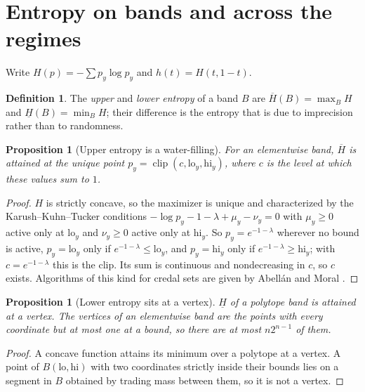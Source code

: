 \documentclass[11pt]{article}
\newtheorem{proposition}[theorem]{Proposition}
\theoremstyle{definition}
\newtheorem{definition}[theorem]{Definition}
\theoremstyle{remark}
\newcommand{\Hup}{\overline{H}}
\newcommand{\Hlo}{\underline{H}}
\begin{document}
\section{Entropy on bands and across the regimes}\label{sec:entropy}

Write $H(p)=-\sum p_y\log p_y$ and $h(t)=H(t,1-t)$.

\begin{definition}\label{def:bandentropy}
The \emph{upper} and \emph{lower entropy} of a band $B$ are $\Hup(B)=\max_BH$ and $\Hlo(B)=\min_BH$; their difference is the
entropy that is due to imprecision rather than to randomness.
\end{definition}

\begin{proposition}[Upper entropy is a water-filling]\label{prop:upper}
For an elementwise band, $\Hup$ is attained at the unique point $p_y=\operatorname{clip}(c,\mathrm{lo}_y,\mathrm{hi}_y)$, where
$c$ is the level at which these values sum to $1$.
\end{proposition}
\begin{proof}
$H$ is strictly concave, so the maximizer is unique and characterized by the Karush--Kuhn--Tucker conditions
$-\log p_y-1-\lambda+\mu_y-\nu_y=0$ with $\mu_y\ge0$ active only at $\mathrm{lo}_y$ and $\nu_y\ge0$ active only at
$\mathrm{hi}_y$. So $p_y=e^{-1-\lambda}$ wherever no bound is active, $p_y=\mathrm{lo}_y$ only if $e^{-1-\lambda}\le\mathrm{lo}_y$, and
$p_y=\mathrm{hi}_y$ only if $e^{-1-\lambda}\ge\mathrm{hi}_y$; with $c=e^{-1-\lambda}$ this is the clip. Its sum is continuous and
nondecreasing in $c$, so $c$ exists. Algorithms of this kind for credal sets are given by Abellán and Moral \cite{AbellanMoral2003}.
\end{proof}

\begin{proposition}[Lower entropy sits at a vertex]\label{prop:lower}
$\Hlo$ of a polytope band is attained at a vertex. The vertices of an elementwise band are the points with every coordinate but
at most one at a bound, so there are at most $n2^{n-1}$ of them.
\end{proposition}
\begin{proof}
A concave function attains its minimum over a polytope at a vertex. A point of $B(\mathrm{lo},\mathrm{hi})$ with two coordinates
strictly inside their bounds lies on a segment in $B$ obtained by trading mass between them, so it is not a vertex.
\end{proof}
\end{document}
